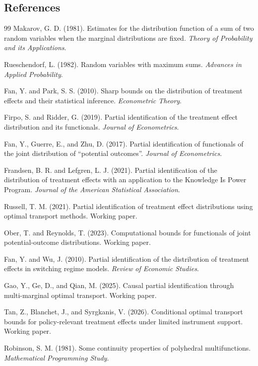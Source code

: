 \documentclass[11pt]{article}
\theoremstyle{definition}
\theoremstyle{plain}
\theoremstyle{remark}
\begin{document}
\subsection*{References}
\begin{thebibliography}{99}
Makarov, G. D. (1981).
Estimates for the distribution function of a sum of two random variables when the marginal distributions are fixed.
\emph{Theory of Probability and its Applications}.

Rueschendorf, L. (1982).
Random variables with maximum sums.
\emph{Advances in Applied Probability}.

Fan, Y. and Park, S. S. (2010).
Sharp bounds on the distribution of treatment effects and their statistical inference.
\emph{Econometric Theory}.

Firpo, S. and Ridder, G. (2019).
Partial identification of the treatment effect distribution and its functionals.
\emph{Journal of Econometrics}.

Fan, Y., Guerre, E., and Zhu, D. (2017).
Partial identification of functionals of the joint distribution of ``potential outcomes''.
\emph{Journal of Econometrics}.

Frandsen, B. R. and Lefgren, L. J. (2021).
Partial identification of the distribution of treatment effects with an application to the Knowledge Is Power Program.
\emph{Journal of the American Statistical Association}.

Russell, T. M. (2021).
Partial identification of treatment effect distributions using optimal transport methods.
Working paper.

Ober, T. and Reynolds, T. (2023).
Computational bounds for functionals of joint potential-outcome distributions.
Working paper.

Fan, Y. and Wu, J. (2010).
Partial identification of the distribution of treatment effects in switching regime models.
\emph{Review of Economic Studies}.

Gao, Y., Ge, D., and Qian, M. (2025).
Causal partial identification through multi-marginal optimal transport.
Working paper.

Tan, Z., Blanchet, J., and Syrgkanis, V. (2026).
Conditional optimal transport bounds for policy-relevant treatment effects under limited instrument support.
Working paper.

Robinson, S. M. (1981).
Some continuity properties of polyhedral multifunctions.
\emph{Mathematical Programming Study}.
\end{thebibliography}
\end{document}
